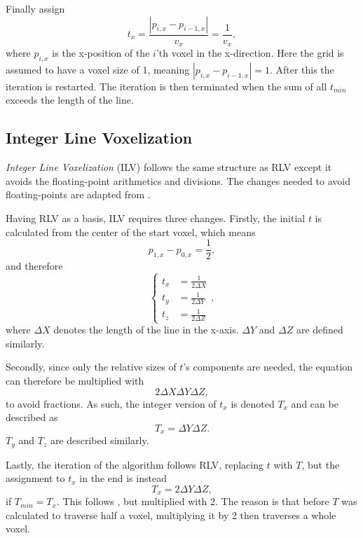 Finally assign 
$$t_x = \frac{|p_{i,x} - p_{i-1,x}|}{v_x} = \frac{1}{v_x},$$
where $p_{i,x}$ is the x-position of the $i$'th voxel in the x-direction.
Here the grid is assumed to have a voxel size of 1, meaning $|p_{i,x} - p_{i-1,x}| = 1$.
After this the iteration is restarted.
The iteration is then terminated when the sum of all $t_{min}$ exceeds the length of the line.



\newpage

\subsection{Integer Line Voxelization}
\textit{Integer Line Voxelization} (ILV) follows the same structure as RLV except it avoids the floating-point arithmetics and divisions.
The changes needed to avoid floating-points are adapted from .

Having RLV as a basis, ILV requires three changes.
Firstly, the initial $t$ is calculated from the center of the start voxel, which means 
$$p_{1,x} - p_{0,x} = \frac{1}{2},$$
and therefore
\begin{equation*}
\left\{
\begin{aligned}
    t_x &= \frac{1}{2 \Delta X} \\
    t_y &= \frac{1}{2 \Delta Y} \\
    t_z &= \frac{1}{2 \Delta Z}
\end{aligned}
\right.
,
\end{equation*}
where $\Delta X$ denotes the length of the line in the x-axis.
$\Delta Y$ and $\Delta Z$ are defined similarly.

Secondly, since only the relative sizes of $t$'s components are needed, the equation can therefore be multiplied with 
$$2 \Delta X\Delta Y\Delta Z,$$
to avoid fractions.
As such, the integer version of $t_x$ is denoted $T_x$ and can be described as
\begin{equation}\label{eq:Tx}
  T_x = \Delta Y\Delta Z.
\end{equation}
$T_y$ and $T_z$ are described similarly.

Lastly, the iteration of the algorithm follows RLV, replacing $t$ with $T$, but the assignment to $t_x$ in the end is instead 
$$T_x = 2 \Delta Y\Delta Z,$$
if $T_{min} = T_x$.
This follows , but multiplied with 2.
The reason is that before $T$ was calculated to traverse half a voxel, multiplying it by 2 then traverses a whole voxel.

